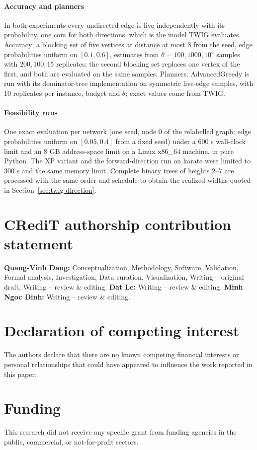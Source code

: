 \documentclass[preprint,11pt]{elsarticle}
\theoremstyle{definition}
\theoremstyle{remark}
\begin{document}
\paragraph{Accuracy and planners} In both experiments every undirected edge is live independently with its probability, one coin for both directions, which is the model TWIG evaluates. Accuracy: a blocking set of five vertices at distance at most $8$ from the seed, edge probabilities uniform on $[0.1,0.6]$, estimates from $\theta=100,1000,10^4$ samples with $200,100,15$ replicates; the second blocking set replaces one vertex of the first, and both are evaluated on the same samples. Planners: AdvancedGreedy is run with its dominator-tree implementation on symmetric live-edge samples, with $10$ replicates per instance, budget and $\theta$; exact values come from TWIG.

\paragraph{Feasibility runs} One exact evaluation per network (one seed, node $0$ of the relabelled graph; edge probabilities uniform on $[0.05,0.4]$ from a fixed seed) under a 600 s wall-clock limit and an 8 GB address-space limit on a Linux x86\_64 machine, in pure Python. The XP variant and the forward-direction run on karate were limited to 300 s and the same memory limit. Complete binary trees of heights $2$--$7$ are processed with the same order and schedule to obtain the realized widths quoted in Section~\ref{sec:twig-direction}.

\section*{CRediT authorship contribution statement}
\textbf{Quang-Vinh Dang:} Conceptualization, Methodology, Software, Validation, Formal analysis, Investigation, Data curation, Visualization, Writing -- original draft, Writing -- review \& editing. \textbf{Dat Le:} Writing -- review \& editing. \textbf{Minh Ngoc Dinh:} Writing -- review \& editing.

\section*{Declaration of competing interest}
The authors declare that there are no known competing financial interests or personal relationships that could have appeared to influence the work reported in this paper.

\section*{Funding}
This research did not receive any specific grant from funding agencies in the public, commercial, or not-for-profit sectors.
\end{document}
